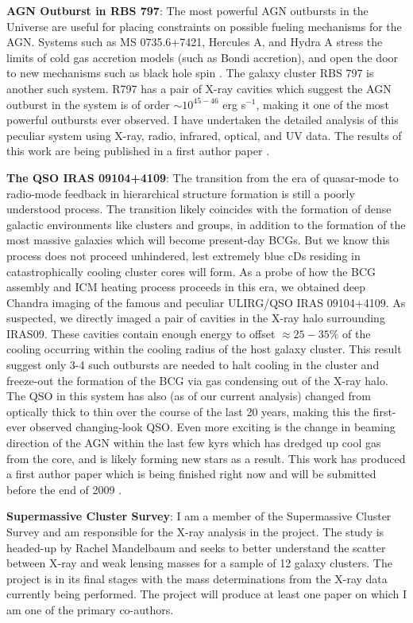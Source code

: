 \documentclass[12pt]{article}
\begin{document}
{\bfseries{AGN Outburst in RBS 797}}: The most powerful AGN outbursts
in the Universe are useful for placing constraints on possible fueling
mechanisms for the AGN. Systems such as MS 0735.6+7421, Hercules A,
and Hydra A stress the limits of cold gas accretion models (such as
Bondi accretion), and open the door to new mechanisms such as black
hole spin \cite{bhspin}. The galaxy cluster RBS 797 is another such
system. R797 has a pair of X-ray cavities which suggest the AGN
outburst in the system is of order $\sim 10^{45-46}$ erg s$^{-1}$,
making it one of the most powerful outbursts ever observed. I have
undertaken the detailed analysis of this peculiar system using X-ray,
radio, infrared, optical, and UV data. The results of this work are
being published in a first author paper \cite{r797}.

{\bfseries{The QSO IRAS 09104+4109}}: The transition from the era of
quasar-mode to radio-mode feedback in hierarchical structure formation
is still a poorly understood process. The transition likely coincides
with the formation of dense galactic environments like clusters and
groups, in addition to the formation of the most massive galaxies
which will become present-day BCGs. But we know this process does not
proceed unhindered, lest extremely blue cDs residing in
catastrophically cooling cluster cores will form. As a probe of how
the BCG assembly and ICM heating process proceeds in this era, we
obtained deep Chandra imaging of the famous and peculiar ULIRG/QSO
IRAS 09104+4109. As suspected, we directly imaged a pair of cavities
in the X-ray halo surrounding IRAS09. These cavities contain enough
energy to offset $\approx 25-35\%$ of the cooling occurring within the
cooling radius of the host galaxy cluster. This result suggest only
3-4 such outbursts are needed to halt cooling in the cluster and
freeze-out the formation of the BCG via gas condensing out of the
X-ray halo. The QSO in this system has also (as of our current
analysis) changed from optically thick to thin over the course of the
last 20 years, making this the first-ever observed changing-look
QSO. Even more exciting is the change in beaming direction of the AGN
within the last few kyrs which has dredged up cool gas from the core,
and is likely forming new stars as a result. This work has produced a
first author paper which is being finished right now and will be
submitted before the end of 2009
\cite{iras09}.

{\bfseries{Supermassive Cluster Survey}}: I am a member of the
Supermassive Cluster Survey and am responsible for the X-ray analysis
in the project. The study is headed-up by Rachel Mandelbaum and seeks
to better understand the scatter between X-ray and weak lensing masses
for a sample of 12 galaxy clusters. The project is in its final stages
with the mass determinations from the X-ray data currently being
performed. The project will produce at least one paper on which I am
one of the primary co-authors.
\end{document}
